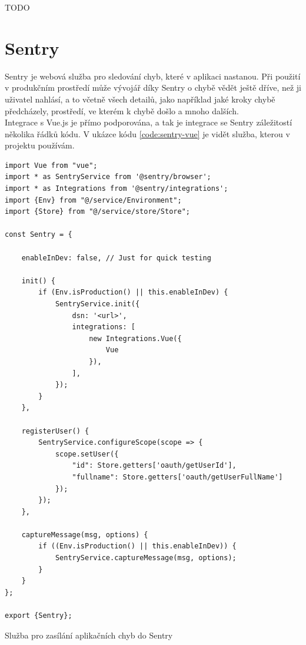 TODO


\section{Sentry}

Sentry \cite{sentry} je webová služba pro sledování chyb, které v aplikaci nastanou. Při použití v produkčním prostředí může vývojář díky Sentry o chybě vědět ještě dříve, než ji uživatel nahlásí, a to včetně všech detailů, jako například jaké kroky chybě předcházely, prostředí, ve kterém k chybě došlo a mnoho dalších.\\
Integrace s Vue.js je přímo podporována, a tak je integrace se Sentry záležitostí několika řádků kódu. V ukázce kódu \ref{code:sentry-vue} je vidět služba, kterou v projektu používám.

\begin{listing}[H]
\begin{verbatim}
import Vue from "vue";
import * as SentryService from '@sentry/browser';
import * as Integrations from '@sentry/integrations';
import {Env} from "@/service/Environment";
import {Store} from "@/service/store/Store";

const Sentry = {

    enableInDev: false, // Just for quick testing

    init() {
        if (Env.isProduction() || this.enableInDev) {
            SentryService.init({
                dsn: '<url>',
                integrations: [
                    new Integrations.Vue({
                        Vue
                    }),
                ],
            });
        }
    },

    registerUser() {
        SentryService.configureScope(scope => {
            scope.setUser({
                "id": Store.getters['oauth/getUserId'],
                "fullname": Store.getters['oauth/getUserFullName']
            });
        });
    },

    captureMessage(msg, options) {
        if ((Env.isProduction() || this.enableInDev)) {
            SentryService.captureMessage(msg, options);
        }
    }
};

export {Sentry};
\end{verbatim}
\caption{Služba pro zasílání aplikačních chyb do Sentry} \label{code:sentry-vue}
\end{listing}

